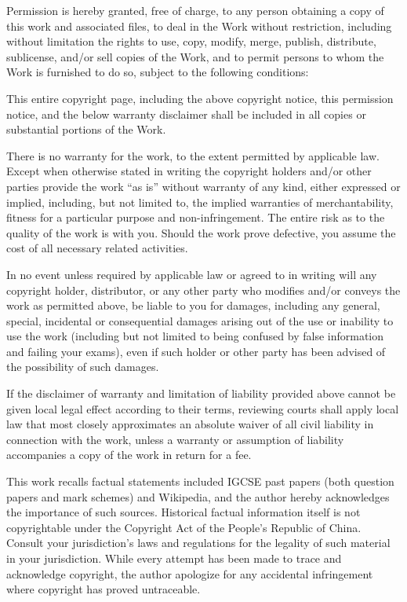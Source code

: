\documentclass[a4paper,numbers=endperiod,most,twoside,english,final,openany]{scrbook} %
\begin{document}
Permission is hereby granted, free of charge, to any person obtaining a copy of this work and associated files, to deal in the Work without restriction, including without limitation the rights to use, copy, modify, merge, publish, distribute, sublicense, and/or sell copies of the Work, and to permit persons to whom the Work is furnished to do so, subject to the following conditions:

This entire copyright page, including the above copyright notice, this permission notice, and the below warranty disclaimer shall be included in all copies or substantial portions of the Work.

There is no warranty for the work, to the extent permitted by applicable law. Except when otherwise stated in writing the copyright holders and/or other parties provide the work ``as is'' without warranty of any kind, either expressed or implied, including, but not limited to, the implied warranties of merchantability, fitness for a particular purpose and non-infringement. The entire risk as to the quality of the work is with you. Should the work prove defective, you assume the cost of all necessary related activities.

In no event unless required by applicable law or agreed to in writing will any copyright holder, distributor, or any other party who modifies and/or conveys the work as permitted above, be liable to you for damages, including any general, special, incidental or consequential damages arising out of the use or inability to use the work (including but not limited to being confused by false information and failing your exams), even if such holder or other party has been advised of the possibility of such damages.

If the disclaimer of warranty and limitation of liability provided above cannot be given local legal effect according to their terms, reviewing courts shall apply local law that most closely approximates an absolute waiver of all civil liability in connection with the work, unless a warranty or assumption of liability accompanies a copy of the work in return for a fee.

This work recalls factual statements included IGCSE past papers (both question papers and mark schemes) and Wikipedia, and the author hereby acknowledges the importance of such sources.  Historical factual information itself is not copyrightable under the Copyright Act of the People's Republic of China.  Consult your jurisdiction's laws and regulations for the legality of such material in your jurisdiction.  While every attempt has been made to trace and acknowledge copyright, the author apologize for any accidental infringement where copyright has proved untraceable.
\end{document}
